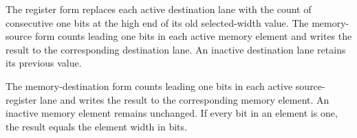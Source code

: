 The register form replaces each active destination lane with the count of
consecutive one bits at the high end of its old selected-width value. The
memory-source form counts leading one bits in each active memory element and
writes the result to the corresponding destination lane. An inactive destination
lane retains its previous value.

The memory-destination form counts leading one bits in each active
source-register lane and writes the result to the corresponding memory element.
An inactive memory element remains unchanged. If every bit in an element is one,
the result equals the element width in bits.
